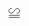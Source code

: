 \documentclass{standalone}
\newcommand*\paraleq{%
  \mathrel{\text{%
    \tikz[baseline]
      \draw (0em,0ex) -- (.8em,0ex)
            (0em,.35ex) -- (.8em,.35ex)
            (.24em,.45ex) -- (.37em,1.5ex)
            (.43em,.45ex) -- (.56em,1.5ex);}}}
\newcommand*\paralogram{%
  \mathord{\text{%
    \tikz[baseline]
      \draw (0,.1ex) -- (.8em,.1ex) -- (1em,1.4ex) -- (.2em,1.4ex) -- cycle;}}}
\newcommand*\similar{%
    \mathrel{\text{%
    \raisebox{0.1ex}{%
    \tikz \draw[baseline] (-.17em,.45ex) arc (90:180:0.23em and 0.45ex) arc (180:270:0.45ex) .. controls (0,-.45ex) and (0em,.45ex) .. (.21em,.45ex) arc (90:0:0.45ex) arc (0:-90:0.23em and 0.45ex);%
    }%
}}}
\newcommand*\congruent{%
    \mathrel{\text{%
    \tikz \draw[baseline] (-.22em,-.4ex) arc (-90:-285:0.4ex) (-.22em,-.4ex) .. controls (0,-.4ex) and (0,.4ex) .. (.22em,.4ex) arc (90:-105:0.4ex) (-.4em,-.75ex) -- (.4em,-.75ex) (-.4em,-1.1ex) -- (.4em,-1.1ex);%
}}}
\begin{document}
$\congruent$
\end{document}
